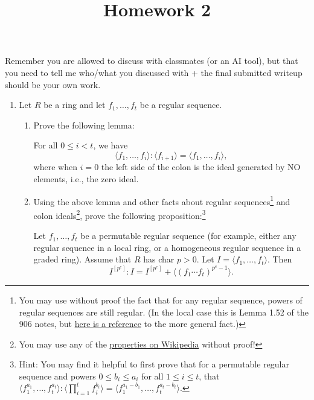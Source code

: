 \documentclass[11pt]{amsart}
\title{Homework 2}
\date{\vspace{-4em}}
\begin{document}
\maketitle\thispagestyle{fancy}

Remember you are allowed to discuss with classmates (or an AI tool), but that you need to tell me who/what you discussed with + the final submitted writeup should be your own work.

\begin{enumerate}[itemsep=3em]
\item Let $R$ be a ring and let $f_1,\ldots, f_t$ be a regular sequence. 
\begin{enumerate}
\item Prove the following lemma:

\begin{lemma}
For all $0\leq i<t$, we have
\[\langle f_1,\ldots, f_{i}\rangle : \langle f_{i+1}\rangle = \langle f_1,\ldots, f_i\rangle,\]
where when $i=0$ the left side of the colon is the ideal generated by NO elements, i.e., the zero ideal.
\end{lemma}





\item Using the above lemma and other facts about regular sequences\footnote{You may use without proof the fact that for any regular sequence, powers of regular sequences are still regular. (In the local case this is Lemma 1.52 of the 906 notes, but \href{https://stacks.math.columbia.edu/tag/07DV}{here is a reference} to the more general fact.)} 
and colon ideals\footnote{You may use any of the \href{https://en.wikipedia.org/wiki/Ideal\%5Fquotient\%23Properties}{properties on Wikipedia} without proof!}, prove the following proposition:\footnote{Hint: You may find it helpful to first prove that for a permutable regular sequence and powers $0\leq b_i\le a_i$ for all $1\le i \le t$, that $\langle f_1^{a_1},\ldots, f_t^{a_t}\rangle :\langle \prod_{i=1}^t f_i^{b_i}\rangle = \langle f_1^{a_1-b_1},\ldots, f_t^{a_t-b_t}\rangle$.}

\begin{prop}
Let $f_1,\ldots, f_t$ be a permutable regular sequence (for example, either any regular sequence in a local ring, or a homogeneous regular sequence in a graded ring). Assume that $R$ has char $p>0$. Let $I=\langle f_1,\ldots, f_t\rangle$. Then 
\[
I^{[p^e]}:I = I^{[p^e]} + \langle (f_1\cdots f_t)^{p^e-1}\rangle.
\]
\end{prop}



\end{enumerate}
\end{enumerate}
\end{document}
